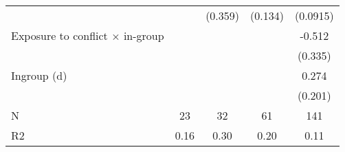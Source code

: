 {\begin{tabular}{l*{4}{c}}
                    &                     &     (0.359)         &     (0.134)         &    (0.0915)         \\
[1em]
Exposure to conflict × in-group&                     &                     &                     &      -0.512         \\
                    &                     &                     &                     &     (0.335)         \\
[1em]
Ingroup (d)         &                     &                     &                     &       0.274         \\
                    &                     &                     &                     &     (0.201)         \\
\hline
N                   &          23         &          32         &          61         &         141         \\
R2                  &        0.16         &        0.30         &        0.20         &        0.11         \\
\hline\hline
\end{tabular}
}
